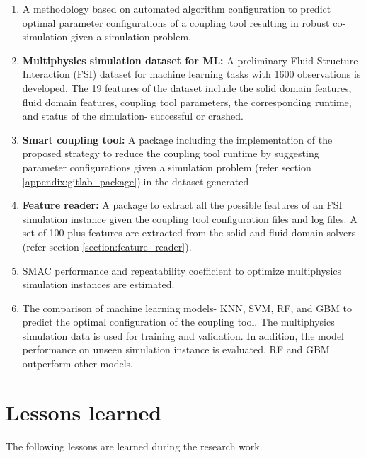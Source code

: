 \begin{enumerate}

\item A methodology based on automated algorithm configuration to predict optimal parameter configurations of a coupling tool resulting in robust co-simulation given a simulation problem.

\item \textbf{Multiphysics simulation dataset for ML:} A preliminary Fluid-Structure Interaction (FSI) dataset for machine learning tasks with 1600 observations is developed. The 19 features of the dataset include the solid domain features, fluid domain features, coupling tool parameters, the corresponding runtime, and status of the simulation- successful or crashed.

\item \textbf{Smart coupling tool:} A package including the implementation of the proposed strategy to reduce the coupling tool runtime by suggesting parameter configurations given a simulation problem (refer section \ref{appendix:gitlab_package}).in the dataset generated

\item \textbf{Feature reader:} A package to extract all the possible features of an FSI simulation instance given the coupling tool configuration files and log files. A set of 100 plus features are extracted from the solid and fluid domain solvers (refer section \ref{section:feature_reader}).

\item SMAC performance and repeatability coefficient to optimize multiphysics simulation instances are estimated. 

\item The comparison of machine learning models- KNN, SVM, RF, and GBM to predict the optimal configuration of the coupling tool. The multiphysics simulation data is used for training and validation. In addition, the model performance on unseen simulation instance is evaluated. RF and GBM outperform other models. 

\end{enumerate}

\section{Lessons learned}

The following lessons are learned during the research work.

